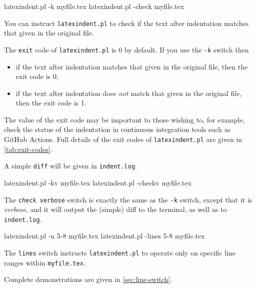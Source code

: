 	\begin{commandshell}
latexindent.pl -k myfile.tex
latexindent.pl -check myfile.tex
\end{commandshell}
	You can%
	 instruct
	\texttt{latexindent.pl} to check if the text after indentation matches that given in the
	original file.

	The \texttt{exit} code
	 of \texttt{latexindent.pl} is 0 by default. If
	you use the \texttt{-k} switch then
	\begin{itemize}
		\item if the text after indentation matches that given in the original file, then the exit code
		      is 0;
		\item if the text after indentation does \emph{not} match that given in the original file, then
		      the exit code is 1.
	\end{itemize}

	The value of the exit code may be important to those wishing to, for example, check the
	status of the indentation in continuous integration tools such as GitHub Actions. Full
	details of the exit codes of \texttt{latexindent.pl} are given in \cref{tab:exit-codes}.

	A simple \texttt{diff} will be given in \texttt{indent.log}.

	\begin{commandshell}
latexindent.pl -kv myfile.tex
latexindent.pl -checkv myfile.tex
\end{commandshell}
	 The \texttt{check verbose} switch is
	exactly the same as the \texttt{-k} switch, except that it is \emph{verbose}, and it will
	output the (simple) diff to the terminal, as well as to \texttt{indent.log}.

	\begin{commandshell}
latexindent.pl -n 5-8 myfile.tex
latexindent.pl -lines 5-8 myfile.tex
\end{commandshell}
	 The \texttt{lines} switch instructs
	\texttt{latexindent.pl} to operate only on specific line ranges within
	\texttt{myfile.tex}.

	Complete demonstrations are given in \cref{sec:line-switch}.

